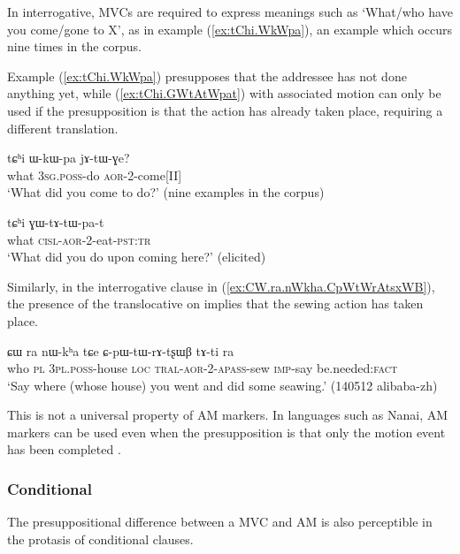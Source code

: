 In interrogative, MVCs are required to express meanings such as `What/who have you come/gone to X', as in example (\ref{ex:tChi.WkWpa}), an example which occurs nine times in the corpus.

Example (\ref{ex:tChi.WkWpa}) presupposes that the addressee has not done anything yet, while (\ref{ex:tChi.GWtAtWpat}) with associated motion can only be used if the presupposition is that the action has already taken place, requiring a different translation.

\begin{exe}
	\ex \label{ex:tChi.WkWpa}
	\gll tɕʰi ɯ-kɯ-pa jɤ-tɯ-ɣe? \\
	what \textsc{3sg}.\textsc{poss}-do \textsc{aor}-2-come[II] \\
	\glt `What did you come to do?' (nine examples in the corpus)
\end{exe}

\begin{exe}
\ex \label{ex:tChi.GWtAtWpat}
\gll tɕʰi ɣɯ-tɤ-tɯ-pa-t \\
what \textsc{cisl}-\textsc{aor}-2-eat-\textsc{pst}:\textsc{tr}    \\
\glt `What did you do upon coming here?' (elicited)
\end{exe}

Similarly, in the interrogative clause in (\ref{ex:CW.ra.nWkha.CpWtWrAtsxWB}), the presence of the translocative on  implies that the sewing action has taken place.

\begin{exe}
\ex \label{ex:CW.ra.nWkha.CpWtWrAtsxWB}
\gll ɕɯ ra nɯ-kʰa tɕe ɕ-pɯ-tɯ-rɤ-tʂɯβ tɤ-ti ra \\
who \textsc{pl} \textsc{3pl}.\textsc{poss}-house \textsc{loc} \textsc{tral}-\textsc{aor}-2-\textsc{apass}-sew \textsc{imp}-say be.needed:\textsc{fact} \\
\glt `Say where (whose house) you went and did some seawing.' (140512 alibaba-zh) 
\end{exe}

This is not a universal property of AM markers. In languages such as Nanai, AM markers can be used even when the presupposition is that only the motion event has been completed \citep{stojnova16nda}.

\subsubsection{Conditional} \label{sec:am.conditional}
The presuppositional difference between a MVC and AM is also perceptible in the protasis of conditional clauses. 


